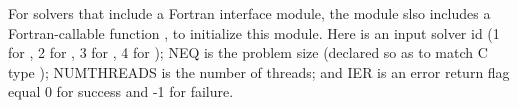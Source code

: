 For solvers that include a Fortran interface module, the {\nvecopenmp}
module slso includes a Fortran-callable function
, to initialize this
{\nvecopenmp} module.  Here  is an input solver id
(1 for {\cvode}, 2 for {\ida}, 3 for {\kinsol}, 4 for {\arkode}); NEQ is
the problem size (declared so as to match C type );
NUMTHREADS is the number of threads; and IER is an error return flag
equal 0 for success and -1 for failure.
